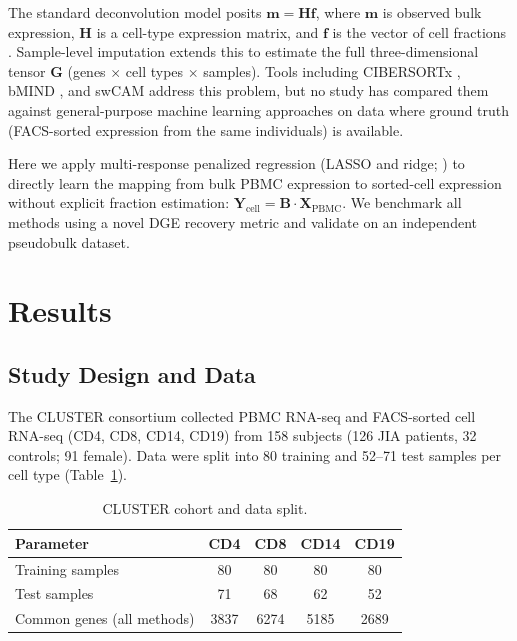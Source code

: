 \documentclass[11pt]{article}
\begin{document}
The standard deconvolution model posits $\mathbf{m} = \mathbf{H}\mathbf{f}$, where $\mathbf{m}$ is observed bulk expression, $\mathbf{H}$ is a cell-type expression matrix, and $\mathbf{f}$ is the vector of cell fractions \citep{newman2015robust}. Sample-level imputation extends this to estimate the full three-dimensional tensor $\mathbf{G}$ (genes $\times$ cell types $\times$ samples). Tools including CIBERSORTx \citep{newman2019cibersortx}, bMIND \citep{wang2021bmind}, and swCAM \citep{wang2020debcam} address this problem, but no study has compared them against general-purpose machine learning approaches on data where ground truth (FACS-sorted expression from the same individuals) is available.

Here we apply multi-response penalized regression (LASSO and ridge; \citealt{tibshirani1996lasso, hoerl1970ridge}) to directly learn the mapping from bulk PBMC expression to sorted-cell expression without explicit fraction estimation: $\mathbf{Y}_\mathrm{cell} = \mathbf{B} \cdot \mathbf{X}_\mathrm{PBMC}$. We benchmark all methods using a novel DGE recovery metric and validate on an independent pseudobulk dataset.

\section{Results}

\subsection{Study Design and Data}

The CLUSTER consortium \citep{mancuso2023cluster} collected PBMC RNA-seq and FACS-sorted cell RNA-seq (CD4, CD8, CD14, CD19) from 158 subjects (126 JIA patients, 32 controls; 91 female). Data were split into 80 training and 52--71 test samples per cell type (Table~\ref{tab:cohort}).

\begin{table}[H]
\centering
\caption{CLUSTER cohort and data split.}
\label{tab:cohort}
\begin{tabular}{lcccc}
\toprule
\textbf{Parameter} & \textbf{CD4} & \textbf{CD8} & \textbf{CD14} & \textbf{CD19} \\
\midrule
Training samples & 80 & 80 & 80 & 80 \\
Test samples & 71 & 68 & 62 & 52 \\
Common genes (all methods) & 3837 & 6274 & 5185 & 2689 \\
\bottomrule
\end{tabular}
\end{table}
\end{document}

